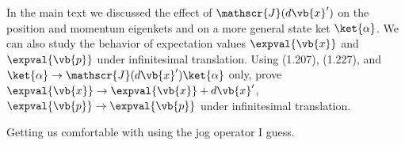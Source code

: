 \begin{question}
  In the main text we discussed the effect of $\mathscr{J}(d\vb{x}')$
  on the position and momentum eigenkets and on a more general state
  ket $\ket{\alpha}$. We can also study the behavior of expectation
  values $\expval{\vb{x}}$ and $\expval{\vb{p}}$ under infinitesimal
  translation. Using (1.207), (1.227), and $\ket{\alpha} \rightarrow
  \mathscr{J}(d\vb{x}') \ket{\alpha}$ only, prove $\expval{\vb{x}}
  \rightarrow \expval{\vb{x}} + d\vb{x}'$, $\expval{\vb{p}}
  \rightarrow \expval{\vb{p}}$ under infinitesimal translation.
\end{question}

\begin{purpose}
  Getting us comfortable with using the jog operator I guess.
\end{purpose}

